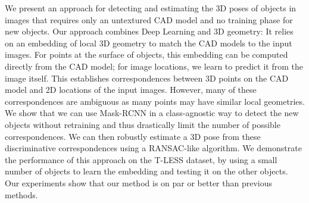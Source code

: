 We  present  an  approach  for  detecting  and  estimating  the 3D  poses  of  objects  in  images  that  requires  only  an  untextured  CAD model  and  no  training  phase  for  new  objects.  Our  approach  combines Deep Learning and 3D geometry: It relies on an embedding of local 3D geometry to match the CAD models to the input images. For points at the surface of objects, this embedding can be computed directly from the CAD model; for image locations, we learn to predict it from the image itself. This establishes correspondences between 3D points on the CAD model  and  2D  locations  of  the  input  images.  However,  many  of  these correspondences are ambiguous as many points may have similar local geometries. We show that we can use Mask-RCNN in a class-agnostic way to detect the new objects without retraining and thus drastically limit the number of possible correspondences. We can then robustly estimate a 3D pose from these discriminative correspondences using a RANSAC-like  algorithm.  We  demonstrate  the  performance  of  this  approach  on the  T-LESS  dataset,  by  using  a  small  number  of  objects  to  learn  the embedding  and  testing  it  on  the  other  objects.  Our  experiments  show that our method is on par or better than previous methods.